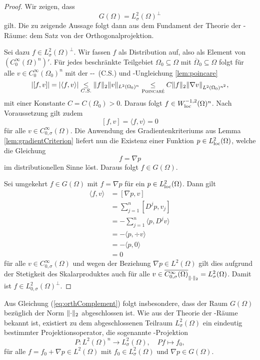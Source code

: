 \begin{proof}
  Wir zeigen, dass 
  \begin{equation}
    \label{eq:orthComplement}
    G(\Omega) = L_\sigma^2(\Omega)^\perp
  \end{equation}
  gilt.
  Die zu zeigende Aussage folgt dann aus dem Fundament der Theorie der \hilbert\hyp{}Räume: dem Satz von der Orthogonalprojektion.

  Sei dazu $f \in L_\sigma^2(\Omega)^\perp$.
  Wir fassen $f$ als Distribution auf, also als Element von $(C_0^\infty(\Omega)^n)'$.
  Für jedes beschränkte Teilgebiet $\Omega_0 \subseteq \Omega$ mit $\overline\Omega_0 \subseteq \Omega$ folgt für alle $v \in C_0^\infty(\Omega_0)^n$ mit der \cauchy\hyp\schwartz-\ (C.S.) und \poincare\hyp{}Ungleichung \ref{lem:poincare}
  $$
  |[f, v]| 
  = |\langle f, v \rangle| 
  \underset{C.S.}{\leq}  \norm{f}_2 \norm{v}_{L^2(\Omega_0)^n}
  \underset{\poincare}{\leq} C \norm{f}_2 \norm{\nabla v}_{L^2(\Omega_0)^{n^2}},
  $$
  mit einer Konstante $C = C(\Omega_0) > 0$.
  Daraus folgt $f \in W_{\loc}^{-1,2}(\Omega)^n$.
  Nach Voraussetzung gilt zudem 
  $$
  [f,v] = \langle f, v \rangle = 0
  $$
  für alle $v \in C_{0, \sigma}^\infty(\Omega)$.
  Die Anwendung des Gradientenkriteriums aus Lemma \ref{lem:gradientCriterion} liefert nun die Existenz einer Funktion $p \in L_{\loc}^2(\Omega)$, welche die Gleichung
  $$
  f = \nabla p
  $$
  im distributionellen Sinne löst.
  Daraus folgt $f \in G(\Omega)$.

  Sei umgekehrt $f \in G(\Omega)$ mit $f = \nabla p$ für ein $p \in L^2_{\loc}(\Omega)$.
  Dann gilt
  \begin{align*}
  \langle f, v \rangle
  &= [ \nabla p, v ] \\
  &= \sum_{j = 1}^n [ D^j p , v_j ] \\
  &= - \sum_{j = 1}^n \langle p, D^jv \rangle \\
  &= - \langle p, \div v \rangle  \\
  &= - \langle p, 0 \rangle  \\
  &= 0
  \end{align*}
  für alle $v \in C_{0, \sigma}^\infty(\Omega)$ und wegen der Beziehung $\nabla p \in L^2(\Omega)$ gilt dies aufgrund der Stetigkeit des Skalarproduktes auch für alle $v \in \overline{C_{0, \sigma}^\infty(\Omega)}_{\norm{\cdot}_2} = L_\sigma^2(\Omega)$.
  Damit ist $f \in L_{0,\sigma}^2(\Omega)^\perp$.
\end{proof}

Aus Gleichung (\ref{eq:orthComplement}) folgt insbesondere, dass der Raum $G(\Omega)$ bezüglich der Norm $\norm{\cdot}_2$ abgeschlossen ist.
Wie aus der Theorie der \hilbert\hyp{}Räume bekannt ist, existiert zu dem abgeschlossenen Teilraum $L_\sigma^2(\Omega)$ ein eindeutig bestimmter Projektionsoperator, die sogenannte \helmholtz\hyp{}Projektion
$$
P \colon L^2(\Omega)^n \to L_\sigma^2(\Omega),\quad Pf \mapsto f_0,
$$
für alle $f = f_0 + \nabla p \in L^2(\Omega)$ mit $f_0 \in L_\sigma^2(\Omega)$ und $\nabla p \in G(\Omega)$.

